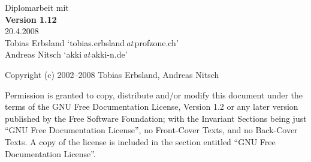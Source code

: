 %
%

\begin{titlepage}
	\vspace*{7cm}
	\begin{center}
		\Huge
		Diplomarbeit mit \DMLLaTeX\\
		\vspace{1cm}
		\large
		\textbf{Version 1.12}\\
		20.4.2008\\
		\vspace{2cm}
		Tobias Erbsland \enquote*{tobias.erbsland\,\emph{at}\,profzone.ch}\\
		Andreas Nitsch \enquote*{akki\,\emph{at}\,akki-n.de}\\
	\end{center}
	\normalsize
	\vfill
	Copyright (c)  2002--2008  Tobias Erbsland, Andreas Nitsch

Permission is granted to copy, distribute and/or modify this document
under the terms of the GNU Free Documentation License, Version 1.2
or any later version published by the Free Software Foundation;
with the Invariant Sections being just \enquote{GNU Free Documentation License},
no Front-Cover Texts, and no Back-Cover Texts.
A copy of the license is included in the section entitled \enquote{GNU
Free Documentation License}.
	
\end{titlepage}

\tableofcontents

\listoffigures

\listoftables


%
%

